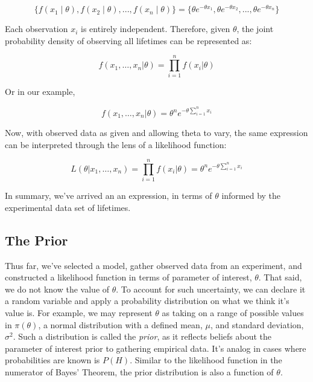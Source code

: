 \documentclass[12pt]{article}
\begin{document}
\begin{equation}
\{f(x_1 \mid \theta), f(x_2 \mid \theta), ..., f(x_n \mid \theta)\} = \{\theta e^{-\theta x_1}, \theta e^{-\theta x_2}, ..., \theta e^{-\theta x_n}\}
\end{equation}

\noindent Each observation $x_i$ is entirely independent. Therefore, given $\theta$, the joint probability density of observing all lifetimes can be represented as:

\begin{equation}
f(x_1, \ldots, x_n|\theta) = \prod_{i=1}^n f(x_i|\theta)
\end{equation}

\noindent Or in our example,

\begin{equation}
f(x_1, \ldots, x_n|\theta) = \theta^n e^{-\theta \sum_{i=1}^n x_i}
\end{equation}

\noindent Now, with observed data as given and allowing theta to vary, the same expression can be interpreted through the lens of a likelihood function:

\begin{equation}
L(\theta | x_1, \ldots, x_n) = \prod_{i=1}^n f(x_i|\theta) = \theta^n e^{-\theta \sum_{i=1}^n x_i}
\end{equation}

\noindent In summary, we've arrived an an expression, in terms of $\theta$ informed by the experimental data set of lifetimes.

\subsection*{The Prior}
\noindent Thus far, we've selected a model, gather observed data from an experiment, and constructed a likelihood function in terms of parameter of interest, $\theta$. That said, we do not know the value of $\theta$. To account for such uncertainty, we can declare it a random variable and apply a probability distribution on what we think it's value is. For example, we may represent $\theta$ as taking on a range of possible values in $\pi(\theta)$, a normal distribution with a defined mean, $\mu$, and standard deviation, $\sigma^2$. Such a distribution is called the \textit{prior}, as it reflects beliefs about the parameter of interest prior to gathering empirical data. It's analog in cases where probabilities are known is $P(H)$. Similar to the likelihood function in the numerator of Bayes' Theorem, the prior distribution is also a function of $\theta$.
\end{document}
